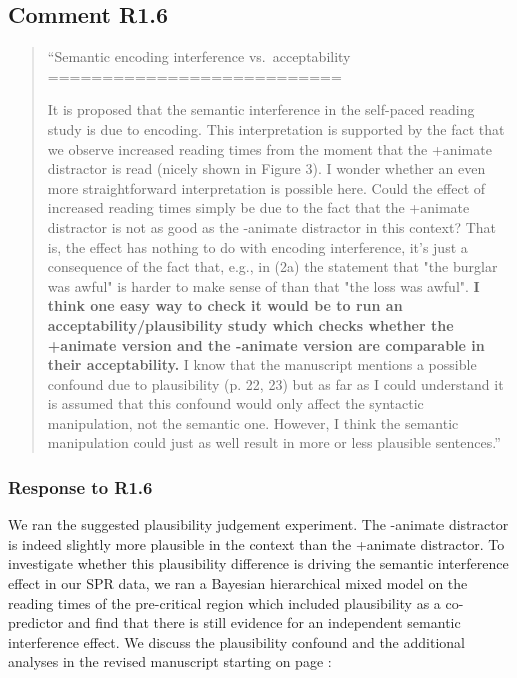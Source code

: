 \documentclass[12pt]{article}
\begin{document}
\subsection*{Comment R1.6}
\begin{quote}
``Semantic encoding interference vs.\ acceptability\\
===========================

It is proposed that the semantic interference in the self-paced reading study is due to encoding. This interpretation is supported by the fact that we observe increased reading times from the moment that the +animate distractor is read (nicely shown in Figure 3). I wonder whether an even more straightforward interpretation is possible here. Could the effect of increased reading times simply be due to the fact that the +animate distractor is not as good as the -animate distractor in this context? That is, the effect has nothing to do with encoding interference, it's just a consequence of the fact that, e.g., in (2a) the statement that "the burglar was awful" is harder to make sense of than that "the loss was awful". \textbf{I think one easy way to check it would be to run an acceptability/plausibility study which checks whether the +animate version and the -animate version are comparable in their acceptability.} I know that the manuscript mentions a possible confound due to plausibility (p. 22, 23) but as far as I could understand it is assumed that this confound would only affect the syntactic manipulation, not the semantic one. However, I think the semantic manipulation could just as well result in more or less plausible sentences.''\end{quote}

\subsubsection*{Response to R1.6}
We ran the suggested plausibility judgement experiment. The -animate distractor is indeed slightly more plausible in the context than the +animate distractor. To investigate whether this plausibility difference is driving the semantic interference effect in our SPR data, we ran a Bayesian hierarchical mixed model on the reading times of the pre-critical region which included plausibility as a co-predictor and find that there is still evidence for an independent semantic interference effect. We discuss the plausibility confound and the additional analyses in the revised manuscript starting on page \pageref{plausib_anim_inan}:
\end{document}
